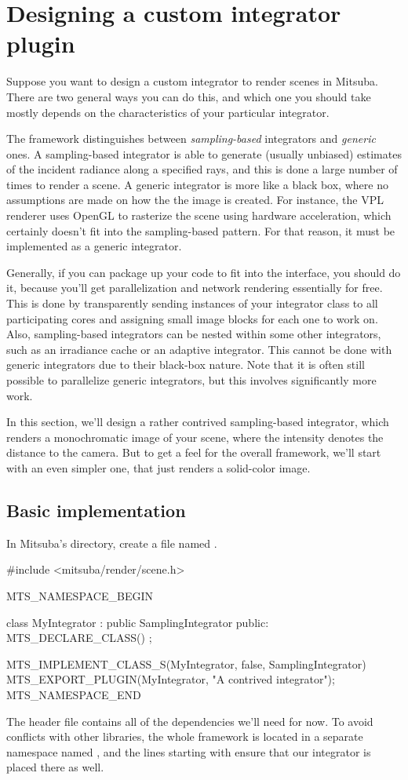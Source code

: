 \section{Designing a custom integrator plugin}
Suppose you want to design a custom integrator to render scenes in Mitsuba.
There are two general ways you can do this, and which one you should take
mostly depends on the characteristics of your particular integrator.

The framework distinguishes between \emph{sampling-based} integrators and
\emph{generic} ones. A sampling-based integrator is able to generate
(usually unbiased) estimates of the incident radiance along a specified rays, and this
is done a large number of times to render a scene. A generic integrator
is more like a black box, where no assumptions are made on how the the image is
created. For instance, the VPL renderer uses OpenGL to rasterize the scene
using hardware acceleration, which certainly doesn't fit into the sampling-based pattern.
For that reason, it must be implemented as a generic integrator.

Generally, if you can package up your code to fit into the
 interface, you should do it, because you'll get
parallelization and network rendering essentially for free. This is done
by transparently sending instances of your integrator class to all participating cores
and assigning small image blocks for each one to work on. Also, sampling-based
integrators can be nested within some other integrators, such as an
irradiance cache or an adaptive integrator. This cannot be done with generic
integrators due to their black-box nature. Note that it is often still
possible to parallelize generic integrators, but this involves significantly
more work.

In this section, we'll design a rather contrived sampling-based integrator,
which renders a monochromatic image of your scene, where the intensity
denotes the distance to the camera. But to get a feel for the overall
framework, we'll start with an even simpler one, that just renders a
solid-color image.

\subsection{Basic implementation}
In Mitsuba's  directory, create a file named
.

\begin{cpp}
#include <mitsuba/render/scene.h>

MTS_NAMESPACE_BEGIN

class MyIntegrator : public SamplingIntegrator {
public:
    MTS_DECLARE_CLASS()
};

MTS_IMPLEMENT_CLASS_S(MyIntegrator, false, SamplingIntegrator)
MTS_EXPORT_PLUGIN(MyIntegrator, "A contrived integrator");
MTS_NAMESPACE_END
\end{cpp}
The  header file contains all of the dependencies we'll need
for now.
To avoid conflicts with other libraries, the whole framework is located in
a separate namespace named , and the lines starting with
 ensure that our integrator is placed there
as well.

